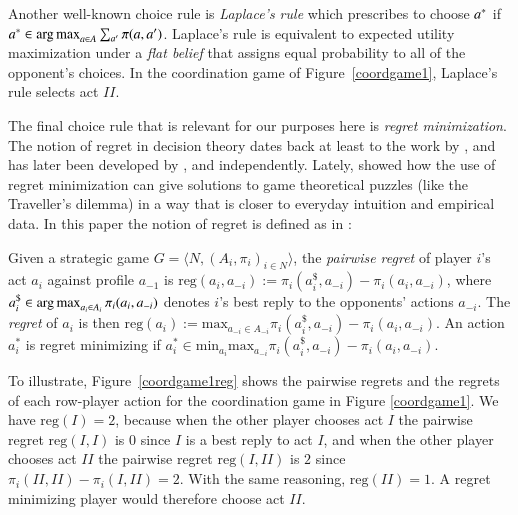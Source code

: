 \documentclass[fleqn,reqno,11pt]{article}
\begin{document}
Another well-known choice rule is \emph{Laplace's rule} which prescribes to choose $a^*$ if
$a^* \in \operatorname*{arg\,max}_{a \in A} \sum_{a'} \pi(a, a')$. Laplace's rule is equivalent to expected
utility maximization under a \emph{flat belief} that assigns equal probability to all of the
opponent's choices. In the coordination game of Figure~\ref{coordgame1}, Laplace's rule selects
act $II$.

The final choice rule that is relevant for our purposes here is \emph{regret
  minimization}. The notion of regret in decision theory dates back at least to the work by
\citet{Savage1951:The-theory-of-s}, and has later been developed by \citet{bell82}, \citet{fish82} and \citet{loosug82} independently. Lately,
\citet{HalpernPass2012:Iterated-Regret} showed how the use of regret minimization can give
solutions to game theoretical puzzles (like the Traveller's dilemma) in a way that is closer to
everyday intuition and empirical data. In this paper the notion of regret is defined as in
\citet{HalpernPass2012:Iterated-Regret}:

\begin{definition} \label{defn:regret} Given a strategic game
  $ G=\langle N, (A_i , \pi_i)_{i \in N} \rangle $, the \emph{pairwise regret} of player $i$'s
  act $a_i$ against profile $a_{-1}$ is
  $\text{reg}(a_i,a_{-i}):= \pi_i(a_i^\$,a_{-i})-\pi_i(a_i,a_{-i}) $, where
  $a_i^\$ \in \operatorname*{arg\,max}_{a_i \in A_i} \pi_i(a_i, a_{-i})$ denotes $i$'s best reply to the
  opponents' actions $a_{-i}$. The \emph{regret} of $a_i$ is then
  $\text{reg}(a_i):= \text{max}_{a_{-i}\in A_{-i}} \pi_i(a_i^\$,a_{-i})-\pi_i(a_i,a_{-i}) $. An
  action $a^{*}_i $ is regret minimizing if
  $a^{*}_i \in \text{min}_{a_i} \text{max}_{a_{-i}} \pi_i(a_i^\$,a_{-i})-\pi_i(a_i,a_{-i}) $.
\end{definition}


To illustrate, Figure~\ref{coordgame1reg} shows the pairwise regrets and the regrets of each
row-player action for the coordination game in Figure \ref{coordgame1}. We have
$\text{reg}(I)=2$, because when the other player chooses act $I$ the pairwise regret
$\text{reg}(I,I)$ is $0$ since $I$ is a best reply to act $I$, and when the other player
chooses act $II$ the pairwise regret $\text{reg}(I, II)$ is $2$ since
$\pi_i(II,II)-\pi_i(I,II)=2$. With the same reasoning, $\text{reg}(II)=1$. A regret minimizing
player would therefore choose act $II$.
\end{document}
